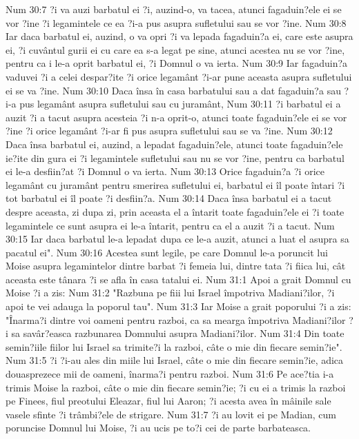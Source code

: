 Num 30:7  ?i va auzi barbatul ei ?i, auzind-o, va tacea, atunci fagaduin?ele ei se vor ?ine ?i legamintele ce ea ?i-a pus asupra sufletului sau se vor ?ine.
Num 30:8  Iar daca barbatul ei, auzind, o va opri ?i va lepada fagaduin?a ei, care este asupra ei, ?i cuvântul gurii ei cu care ea s-a legat pe sine, atunci acestea nu se vor ?ine, pentru ca i le-a oprit barbatul ei, ?i Domnul o va ierta.
Num 30:9  Iar fagaduin?a vaduvei ?i a celei despar?ite ?i orice legamânt ?i-ar pune aceasta asupra sufletului ei se va ?ine.
Num 30:10  Daca însa în casa barbatului sau a dat fagaduin?a sau ?i-a pus legamânt asupra sufletului sau cu juramânt,
Num 30:11  ?i barbatul ei a auzit ?i a tacut asupra acesteia ?i n-a oprit-o, atunci toate fagaduin?ele ei se vor ?ine ?i orice legamânt ?i-ar fi pus asupra sufletului sau se va ?ine.
Num 30:12  Daca însa barbatul ei, auzind, a lepadat fagaduin?ele, atunci toate fagaduin?ele ie?ite din gura ei ?i legamintele sufletului sau nu se vor ?ine, pentru ca barbatul ei le-a desfiin?at ?i Domnul o va ierta.
Num 30:13  Orice fagaduin?a ?i orice legamânt cu juramânt pentru smerirea sufletului ei, barbatul ei îl poate întari ?i tot barbatul ei îl poate ?i desfiin?a.
Num 30:14  Daca însa barbatul ei a tacut despre aceasta, zi dupa zi, prin aceasta el a întarit toate fagaduin?ele ei ?i toate legamintele ce sunt asupra ei le-a întarit, pentru ca el a auzit ?i a tacut.
Num 30:15  Iar daca barbatul le-a lepadat dupa ce le-a auzit, atunci a luat el asupra sa pacatul ei".
Num 30:16  Acestea sunt legile, pe care Domnul le-a poruncit lui Moise asupra legamintelor dintre barbat ?i femeia lui, dintre tata ?i fiica lui, cât aceasta este tânara ?i se afla în casa tatalui ei.
Num 31:1  Apoi a grait Domnul cu Moise ?i a zis:
Num 31:2  "Razbuna pe fiii lui Israel împotriva Madiani?ilor, ?i apoi te vei adauga la poporul tau".
Num 31:3  Iar Moise a grait poporului ?i a zis: "Înarma?i dintre voi oameni pentru razboi, ca sa mearga împotriva Madiani?ilor ?i sa savâr?easca razbunarea Domnului asupra Madiani?ilor.
Num 31:4  Din toate semin?iile fiilor lui Israel sa trimite?i la razboi, câte o mie din fiecare semin?ie".
Num 31:5  ?i ?i-au ales din miile lui Israel, câte o mie din fiecare semin?ie, adica douasprezece mii de oameni, înarma?i pentru razboi.
Num 31:6  Pe ace?tia i-a trimis Moise la razboi, câte o mie din fiecare semin?ie; ?i cu ei a trimis la razboi pe Finees, fiul preotului Eleazar, fiul lui Aaron; ?i acesta avea în mâinile sale vasele sfinte ?i trâmbi?ele de strigare.
Num 31:7  ?i au lovit ei pe Madian, cum poruncise Domnul lui Moise, ?i au ucis pe to?i cei de parte barbateasca.
